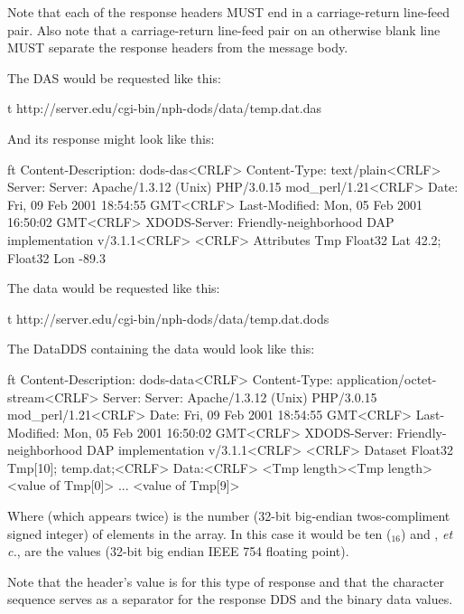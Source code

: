 \documentclass[justify]{nasa-ese}
\begin{document}
Note that each of the response headers MUST end in a carriage-return
line-feed pair. Also note that a carriage-return
line-feed pair on an otherwise blank line MUST separate the response headers
from the message body\cite{rfc2045,rfc2046}.

The DAS would be requested like this:

\begin{vcode}{t}
http://server.edu/cgi-bin/nph-dods/data/temp.dat.das
\end{vcode}

And its response might look like this:

\begin{vcode}{ft}
Content-Description: dods-das<CRLF>
Content-Type: text/plain<CRLF>
Server: Server: Apache/1.3.12 (Unix)  PHP/3.0.15 mod_perl/1.21<CRLF>
Date: Fri, 09 Feb 2001 18:54:55 GMT<CRLF>
Last-Modified: Mon, 05 Feb 2001 16:50:02 GMT<CRLF>
XDODS-Server: Friendly-neighborhood DAP implementation v/3.1.1<CRLF>
<CRLF>
Attributes {
  Tmp {
    Float32 Lat 42.2;
    Float32 Lon -89.3
  }
}
\end{vcode}


The data would be requested like this:

\begin{vcode}{t}
http://server.edu/cgi-bin/nph-dods/data/temp.dat.dods
\end{vcode}

The DataDDS containing the data would look like this:

\begin{vcode}{ft}
Content-Description: dods-data<CRLF>
Content-Type: application/octet-stream<CRLF>
Server: Server: Apache/1.3.12 (Unix)  PHP/3.0.15 mod_perl/1.21<CRLF>
Date: Fri, 09 Feb 2001 18:54:55 GMT<CRLF>
Last-Modified: Mon, 05 Feb 2001 16:50:02 GMT<CRLF>
XDODS-Server: Friendly-neighborhood DAP implementation v/3.1.1<CRLF>
<CRLF>
Dataset {
  Float32 Tmp[10];
} temp.dat;<CRLF>
Data:<CRLF>
<Tmp length><Tmp length><value of Tmp[0]> ... <value of Tmp[9]>
\end{vcode}

Where  (which appears twice) is the number (32-bit
 big-endian twos-compliment signed integer) of elements in the array. In this
 case it would be ten ($_{16}$) and ,
 {\it et c.}, are the values (32-bit big endian IEEE 754 floating point).

Note that the  header's value is
 for this type of response and that the
character sequence  serves as a separator for the
response DDS and the binary data values.
\end{document}
